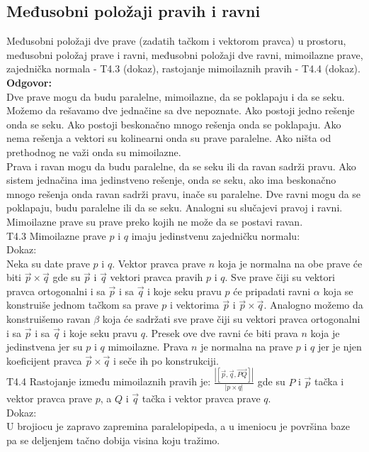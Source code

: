 \documentclass[12pt]{article}
\begin{document}
    \subsection{Međusobni položaji pravih i ravni}
    \label{subsec:pitanje_16}
    Međusobni položaji dve prave (zadatih tačkom i vektorom
    pravca) u prostoru, međusobni položaj prave i ravni,
    međusobni položaji dve ravni, mimoilazne prave, zajednička
    normala - T4.3 (dokaz), rastojanje mimoilaznih pravih -
    T4.4 (dokaz).
    \\
    \textbf{Odgovor:}\\
    Dve prave mogu da budu paralelne, mimoilazne,
    da se poklapaju i da se seku. Možemo da rešavamo
    dve jednačine sa dve nepoznate. Ako postoji
    jedno rešenje onda se seku. Ako postoji beskonačno
    mnogo rešenja onda se poklapaju. Ako nema rešenja
    a vektori su kolinearni onda su prave paralelne.
    Ako ništa od prethodnog ne važi onda su mimoilazne.\\
    Prava i ravan mogu da budu paralelne, da se seku
    ili da ravan sadrži pravu. Ako sistem jednačina
    ima jedinstveno rešenje, onda se seku, ako ima
    beskonačno mnogo rešenja onda ravan sadrži pravu,
    inače su paralelne.
    Dve ravni mogu da se poklapaju, budu paralelne ili da se seku.
    Analogni su slučajevi pravoj i ravni.\\
    Mimoilazne prave su prave preko kojih ne može da se
    postavi ravan.\\
    T4.3 Mimoilazne prave $p$ i $q$ imaju jedinstvenu
    zajedničku normalu:\\
    Dokaz:\\
    Neka su date prave $p$ i $q$. Vektor pravca
    prave $n$ koja je normalna na obe prave će
    biti $\overrightarrow{p}\times\overrightarrow{q}$ gde su
$\overrightarrow{p}$ i $\overrightarrow{q}$ vektori
    pravca pravih $p$ i $q$. Sve prave čiji su
    vektori pravca ortogonalni
    i sa $\overrightarrow{p}$ i sa $\overrightarrow{q}$
    i koje seku pravu $p$ će
    pripadati ravni $\alpha$ koja se konstruiše
    jednom tačkom sa prave $p$ i vektorima $\overrightarrow{p}$
    i $\overrightarrow{p}\times\overrightarrow{q}$.
    Analogno možemo da konstruišemo ravan $\beta$
    koja će sadržati sve prave čiji su
    vektori pravca ortogonalni
    i sa $\overrightarrow{p}$ i sa $\overrightarrow{q}$
    i koje seku pravu $q$. Presek ove dve ravni
    će biti prava $n$ koja je jedinstvena jer
    su $p$ i $q$ mimoilazne. Prava $n$ je normalna
    na prave $p$ i $q$ jer je njen koeficijent pravca
$\overrightarrow{p}\times \overrightarrow{q}$ i seče
    ih po konstrukciji.\\
    T4.4 Rastojanje između mimoilaznih pravih je:
$\frac{|[\overrightarrow{p},\overrightarrow{q},\overrightarrow{PQ}]|}{|p\times q|}$ gde su
$P$ i $\overrightarrow{p}$ tačka i vektor pravca prave $p$,
    a $Q$ i $\overrightarrow{q}$ tačka i vektor pravca prave $q$.\\
    Dokaz:\\
    U brojiocu je zapravo zapremina paralelopipeda, a u
    imeniocu je površina baze pa se deljenjem tačno dobija
    visina koju tražimo.
\end{document}
